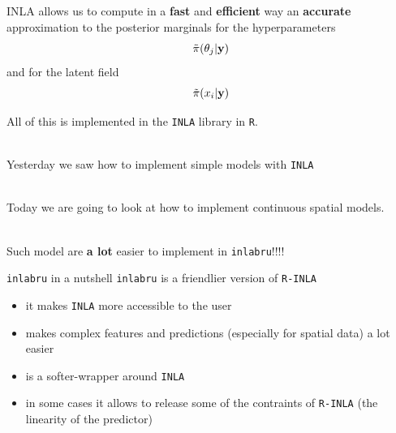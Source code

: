 \documentclass[
  ignorenonframetext,
]{beamer}
\begin{document}
\begin{frame}[fragile]{}
\protect\hypertarget{section}{}
INLA allows us to compute in a \textbf{fast} and \textbf{efficient} way
an \textbf{accurate} approximation to the posterior marginals for the
hyperparameters \[
\tilde{\pi}(\theta_j|{\bf y})
\] and for the latent field \[
\tilde{\pi}(x_i|{\bf y})
\] \pause 

All of this is implemented in the \texttt{INLA} library in \texttt{R}.\\
\strut \\

Yesterday we saw how to implement simple models with \texttt{INLA}\\
\strut \\

Today we are going to look at how to implement continuous spatial
models.\\
\strut \\

Such model are \textbf{a lot} easier to implement in
\texttt{inlabru}!!!!
\end{frame}

\begin{frame}[fragile]{\texttt{inlabru} in a nutshell}
\protect\hypertarget{inlabru-in-a-nutshell}{}
\texttt{inlabru} is a friendlier version of \texttt{R-INLA}

\begin{itemize}
\item
  it makes \texttt{INLA} more accessible to the user
\item
  makes complex features and predictions (especially for spatial data) a
  lot easier
\item
  is a softer-wrapper around \texttt{INLA}
\item
  in some cases it allows to release some of the contraints of
  \texttt{R-INLA} (the linearity of the predictor)
\end{itemize}
\end{frame}
\end{document}
